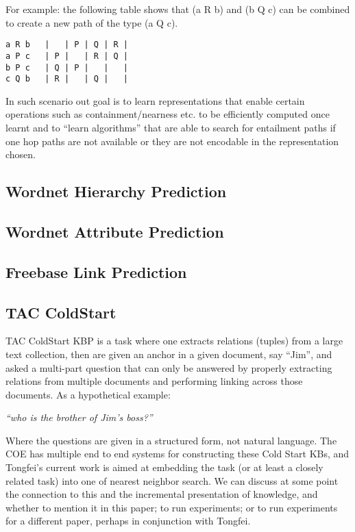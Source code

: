 \documentclass[11pt]{article}
\begin{document}
For example: the following table shows that (a R b) and (b Q c) can be
combined to create a new path of the type (a Q c).
\begin{verbatim}
a R b   |   | P | Q | R |
a P c   | P |   | R | Q |
b P c   | Q | P |   |   |
c Q b   | R |   | Q |   |
\end{verbatim}


In such scenario out goal is to learn representations that enable
certain operations such as containment/nearness etc. to be efficiently
computed once learnt and to ``learn algorithms'' that are able to
search for entailment paths if one hop paths are not available or they
are not encodable in the representation chosen.

\subsection{Wordnet Hierarchy Prediction}
\label{sec:wordn-hier-pred}


\subsection{Wordnet Attribute Prediction}
\label{sec:wordn-attr-pred}



\subsection{Freebase Link Prediction}
\label{sec:freeb-link-pred}

\subsection{TAC ColdStart}
\label{sec:coldstart}

TAC ColdStart KBP is a task where one extracts relations (tuples) from
a large text collection, then are given an anchor in a given document,
say ``Jim'', and asked a multi-part question that can only be answered
by properly extracting relations from multiple documents and
performing linking across those documents.  As a hypothetical example:

\emph{``who is the brother of Jim's boss?''}

Where the questions are given in a structured form, not natural
language.  The COE has multiple end to end systems for constructing
these Cold Start KBs, and Tongfei's current work is aimed at embedding
the task (or at least a closely related task) into one of nearest
neighbor search.  We can discuss at some point the connection to this
and the incremental presentation of knowledge, and whether to mention
it in this paper; to run experiments; or to run experiments for a
different paper, perhaps in conjunction with Tongfei.
\end{document}
